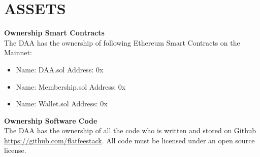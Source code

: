 \section{ASSETS}\label{sec:assets}

\item \textbf{Ownership Smart Contracts} \\
The DAA has the ownership of following Ethereum Smart Contracts on the Mainnet:
\begin{itemize}
    \item Name: DAA.sol Address: 0x %
    \item Name: Membership.sol Address: 0x %
    \item Name: Wallet.sol Address: 0x %
\end{itemize}

\item \textbf{Ownership Software Code} \\
The DAA has the ownership of all the code who is written and stored on Github \url{https://github.com/flatfeestack}. All code must be licensed under an open source license.
